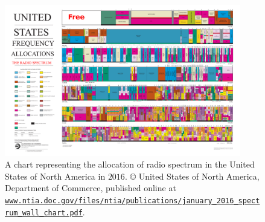 \begin{figure}[h!]
    \centering
    \includegraphics[width=0.92\textwidth]{United_States_Frequency_Allocations_Chart_2016_The_Radio_Spectrum_3.pdf}
    \caption[A chart representing the allocation of radio spectrum in the United States of North America in $2016$]{A chart representing the allocation of radio spectrum in the United States of North America in $2016$. \copyright{} United States of North America, Department of Commerce, published online at \href{https://www.ntia.doc.gov/files/ntia/publications/january_2016_spectrum_wall_chart.pdf}{\texttt{www.ntia.doc.gov/files/ntia/publications/january\_2016\_spectrum\_wall\_chart.pdf}}.}
    \label{fig:1:United_States_Frequency_Allocations_Chart_2016_The_Radio_Spectrum}
\end{figure}

